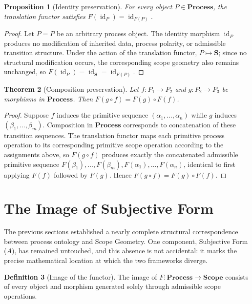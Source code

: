 \documentclass[11pt,twoside,openright]{book}
\numberwithin{equation}{chapter}
\theoremstyle{definition}
\newtheorem{definition}{Definition}[chapter]
\theoremstyle{plain}
\newtheorem{theorem}[definition]{Theorem}
\newtheorem{proposition}[definition]{Proposition}
\theoremstyle{remark}
\theoremstyle{definition}
\newcommand{\CatScope}{\mathbf{Scope}}
\newcommand{\CatProcess}{\mathbf{Process}}
\newcommand{\Scope}{\mathbf{S}}
\newcommand{\WPrehensions}{P}
\newcommand{\WSubjForm}{A}
\begin{document}
\begin{proposition}[Identity preservation]
\label{prop:identity_preservation}
For every object $P\in\CatProcess$, the translation functor satisfies
$F(\operatorname{id}_{P})=\operatorname{id}_{F(P)}$.
\end{proposition}

\begin{proof}
Let $P=\WPrehensions$ be an arbitrary process object. The identity
morphism $\operatorname{id}_{P}$ produces no modification of inherited
data, process polarity, or admissible transition structure. Under the
action of the translation functor, $P\mapsto\Scope$; since no structural
modification occurs, the corresponding scope geometry also remains
unchanged, so $F(\operatorname{id}_{P})=\operatorname{id}_{\Scope}=\operatorname{id}_{F(P)}$.
\end{proof}

\begin{theorem}[Composition preservation]
\label{thm:functor_composition}
Let $f:P_1\to P_2$ and $g:P_2\to P_3$ be morphisms in $\CatProcess$. Then
$F(g\circ f)=F(g)\circ F(f)$.
\end{theorem}

\begin{proof}
Suppose $f$ induces the primitive sequence $(\alpha_1,\ldots,\alpha_n)$
while $g$ induces $(\beta_1,\ldots,\beta_m)$. Composition in $\CatProcess$
corresponds to concatenation of these transition sequences. The
translation functor maps each primitive process operation to its
corresponding primitive scope operation according to the assignments
above, so $F(g\circ f)$ produces exactly the concatenated admissible
primitive sequence
$F(\beta_1),\ldots,F(\beta_m),F(\alpha_1),\ldots,F(\alpha_n)$, identical to
first applying $F(f)$ followed by $F(g)$. Hence
$F(g\circ f)=F(g)\circ F(f)$.
\end{proof}

\section{The Image of Subjective Form}

The previous sections established a nearly complete structural
correspondence between process ontology and Scope Geometry. One
component, Subjective Form ($\WSubjForm$), has remained untouched, and
this absence is not accidental: it marks the precise mathematical
location at which the two frameworks diverge.

\begin{definition}[Image of the functor]
The image of $F:\CatProcess\to\CatScope$ consists of every object and
morphism generated solely through admissible scope operations.
\end{definition}
\end{document}

